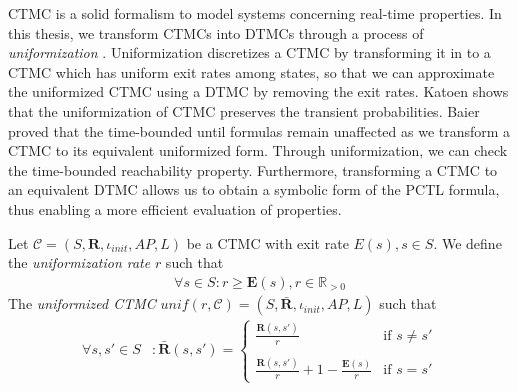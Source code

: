 CTMC is a solid formalism to model systems concerning real-time properties. In this thesis,
we transform CTMCs into DTMCs through a process of \textit{uniformization} \cite{katoen2001faster}.
Uniformization discretizes a CTMC by transforming it in to a CTMC which has uniform exit rates among
states, so that we can approximate the uniformized CTMC using a DTMC by removing the exit rates.
Katoen \cite{katoen2001faster} shows that the uniformization of CTMC preserves the transient
probabilities. Baier \cite{baier2002simulation} proved that the time-bounded until formulas remain
unaffected as we transform a CTMC to its equivalent uniformized form. Through uniformization, we can
check the time-bounded reachability property. Furthermore, transforming a CTMC to an equivalent DTMC
allows us to obtain a symbolic form of the PCTL formula, thus enabling a more efficient evaluation
of properties.

\begin{definition}
      \rm
      Let $\mathcal{C} = (S,\mathbf{R}, \iota_{init}, AP, L)$ be a CTMC with exit rate $E(s), s\in S$. We
      define the \textit{uniformization rate} $r$ such that
      \begin{align*}
            \forall s\in S: r \geq \mathbf{E}(s), r\in\mathbb{R}_{>0}
      \end{align*}
      The \textit{uniformized CTMC} $unif(r, \mathcal{C})=(S, \bar{\mathbf{R}}, \iota_{init}, AP, L )$ such that
      \begin{align*}
            \forall s, s'\in S & : \bar{\mathbf{R}}(s,s')=
            \begin{cases}
                  \frac{\mathbf{R}(s,s')}{r}                               & \text{if $s \neq s'$} \\ \quad \\
                  \frac{\mathbf{R}(s,s')}{r} + 1 - \frac{\mathbf{E}(s)}{r} & \text{if $s = s'$}
            \end{cases}
      \end{align*}
\end{definition}

